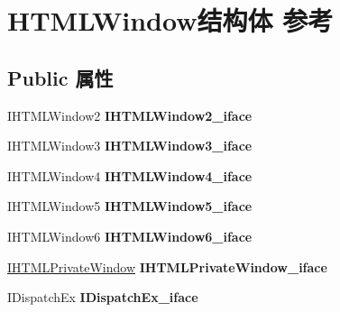 \hypertarget{struct_h_t_m_l_window}{}\section{H\+T\+M\+L\+Window结构体 参考}
\label{struct_h_t_m_l_window}
\subsection*{Public 属性}
\begin{DoxyCompactItemize}
\item 
\mbox{\label{struct_h_t_m_l_window_afdaff483474af9aa4e5585c3d161133f}} 
I\+H\+T\+M\+L\+Window2 {\bfseries I\+H\+T\+M\+L\+Window2\+\_\+iface}
\item 
\mbox{\label{struct_h_t_m_l_window_a3f2ebb4dfa9f3c19db457e055e744a07}} 
I\+H\+T\+M\+L\+Window3 {\bfseries I\+H\+T\+M\+L\+Window3\+\_\+iface}
\item 
\mbox{\label{struct_h_t_m_l_window_aee07b32b983d89d9e23ad5454dcb94ae}} 
I\+H\+T\+M\+L\+Window4 {\bfseries I\+H\+T\+M\+L\+Window4\+\_\+iface}
\item 
\mbox{\label{struct_h_t_m_l_window_a4f9a0bd32dceae878ce177cfc514b4a4}} 
I\+H\+T\+M\+L\+Window5 {\bfseries I\+H\+T\+M\+L\+Window5\+\_\+iface}
\item 
\mbox{\label{struct_h_t_m_l_window_a20b199d6a6282a696237ba2f9c0a4d69}} 
I\+H\+T\+M\+L\+Window6 {\bfseries I\+H\+T\+M\+L\+Window6\+\_\+iface}
\item 
\mbox{\label{struct_h_t_m_l_window_a1e34e0881ef7734d6bc16cd5db142618}} 
\hyperlink{interface_i_h_t_m_l_private_window}{I\+H\+T\+M\+L\+Private\+Window} {\bfseries I\+H\+T\+M\+L\+Private\+Window\+\_\+iface}
\item 
\mbox{\label{struct_h_t_m_l_window_a4ea4ff0cb13819cffd46836d7eba3efd}} 
I\+Dispatch\+Ex {\bfseries I\+Dispatch\+Ex\+\_\+iface}
\item 
\mbox{\label{struct_h_t_m_l_window_a176d27cd8e7f6c21311ff42536b137d4}} 

\end{DoxyCompactItemize}
